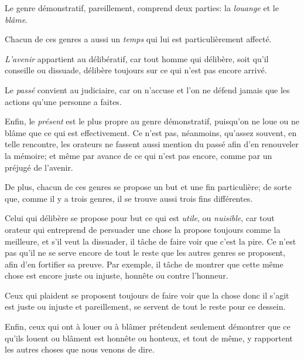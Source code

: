 Le genre démonstratif, pareillement, comprend deux parties: la \emph{louange} et le \emph{blâme}.

\bigbreak

Chacun de ces genres a aussi un \emph{temps} qui lui est particulièrement affecté.

\emph{L'avenir} appartient au délibératif, car tout homme qui délibère, soit qu'il conseille ou dissuade, délibère toujours
sur ce qui n'est pas encore arrivé. 

Le \emph{passé} convient au judiciaire, car on n'accuse et l'on ne défend jamais que les actions qu'une personne a faites. 

Enfin, le \emph{présent} est le plus propre au genre démonstratif, puisqu'on ne loue ou ne blâme que ce qui est effectivement.
Ce n'est pas, néanmoins, qu'assez souvent, en telle rencontre, les orateurs ne fassent aussi mention du passé afin d'en
renouveler la mémoire; et même par avance de ce qui n'est pas encore, comme par un préjugé de l'avenir. 

\bigbreak

De plus, chacun de ces genres se propose un but et une fin particulière; de sorte que, comme il y a trois genres, il se
trouve aussi trois fins différentes.

Celui qui délibère se propose pour but ce qui est \emph{utile}, ou \emph{nuisible}, car tout orateur qui entreprend de
persuader une chose la propose toujours comme la meilleure, et s'il veut la dissuader, il tâche de faire voir que c'est
la pire. Ce n'est pas qu'il ne se serve encore de tout le reste que les autres genres se proposent, afin d'en fortifier
sa preuve. Par exemple, il tâche de montrer que cette même chose est encore juste ou injuste, honnête ou contre l'honneur. 

Ceux qui plaident se proposent toujours de faire voir que la chose donc il s'agit est juste ou injuste et pareillement,
se servent de tout le reste pour ce dessein.

Enfin, ceux qui ont à louer ou à blâmer prétendent seulement démontrer que ce qu'ils louent ou blâment est honnête ou
honteux, et tout de même, y rapportent les autres choses que nous venons de dire.

